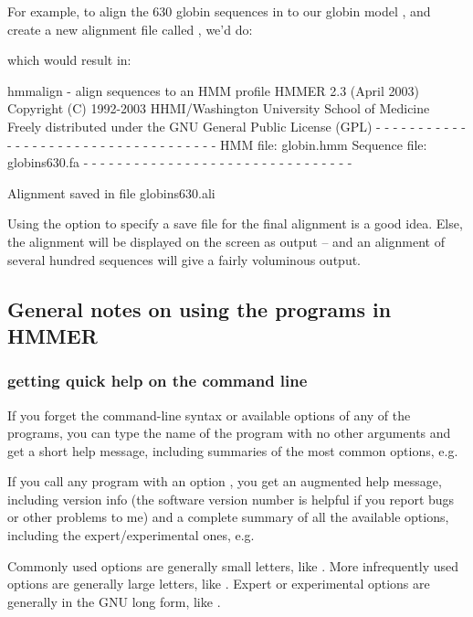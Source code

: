 For example, to align the 630 globin sequences in 
to our globin model , and create a new alignment file
called , we'd do:


which would result in:

\begin{sreoutput}
hmmalign - align sequences to an HMM profile
HMMER 2.3 (April 2003)
Copyright (C) 1992-2003 HHMI/Washington University School of Medicine
Freely distributed under the GNU General Public License (GPL)
- - - - - - - - - - - - - - - - - - - - - - - - - - - - - - - - - - - -
HMM file:             globin.hmm
Sequence file:        globins630.fa
- - - - - - - - - - - - - - - - - - - - - - - - - - - - - - - -

Alignment saved in file globins630.ali
\end{sreoutput}

Using the  option to specify a save file for the final
alignment is a good idea. Else, the alignment will be displayed on the
screen as output -- and an alignment of several hundred sequences will
give a fairly voluminous output.


\subsection{General notes on using the programs in HMMER}

\subsubsection{getting quick help on the command line}

If you forget the command-line syntax or available options of any of
the programs, you can type the name of the program with no other
arguments and get a short help message, including summaries of the
most common options, e.g.

 
If you call any program with an option , you get an augmented
help message, including version info (the software version number is
helpful if you report bugs or other problems to me) and a complete
summary of all the available options, including the
expert/experimental ones, e.g.


Commonly used options are generally small letters, like .
More infrequently used options are generally large letters, like
. Expert or experimental options are generally in the GNU
long form, like .

